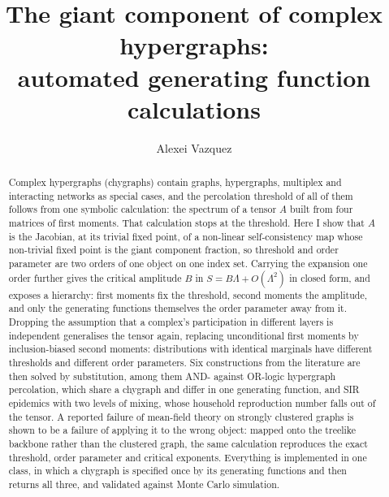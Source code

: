 \documentclass[aps,pre,twocolumn,superscriptaddress,floatfix,longbibliography]{revtex4-2}
\begin{document}
\title{The giant component of complex hypergraphs:\\
automated generating function calculations}

\author{Alexei Vazquez}

\begin{abstract}
Complex hypergraphs (chygraphs) contain graphs, hypergraphs, multiplex and
interacting networks as special cases, and the percolation threshold of all of
them follows from one symbolic calculation: the spectrum of a tensor $A$ built
from four matrices of first moments. That calculation stops at the threshold.
Here I show that $A$ is the Jacobian, at its trivial fixed point, of a
non-linear self-consistency map whose non-trivial fixed point is the giant
component fraction, so threshold and order parameter are two orders of one
object on one index set. Carrying the expansion one order further gives the
critical amplitude $B$ in $S=B\Lambda+O(\Lambda^2)$ in closed form, and exposes
a hierarchy: first moments fix the threshold, second moments the amplitude, and
only the generating functions themselves the order parameter away from it.
Dropping the assumption that a complex's participation in different layers is
independent generalises the tensor again, replacing unconditional first moments
by inclusion-biased second moments: distributions with identical marginals have
different thresholds and different order parameters. Six constructions from the
literature are then solved by substitution, among them AND- against OR-logic
hypergraph percolation, which share a chygraph and differ in one generating
function, and SIR epidemics with two levels of mixing, whose household
reproduction number falls out of the tensor. A reported failure of mean-field
theory on strongly clustered graphs is shown to be a failure of applying it to
the wrong object: mapped onto the treelike backbone rather than the clustered
graph, the same calculation reproduces the exact threshold, order parameter and
critical exponents. Everything is implemented in one class, in which a chygraph
is specified once by its generating functions and then returns all three, and
validated against Monte Carlo simulation.
\end{abstract}

\maketitle
\end{document}
